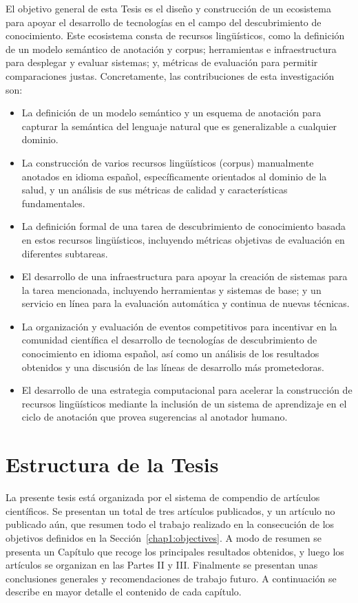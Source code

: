 El objetivo general de esta Tesis es el diseño y construcción de un ecosistema para apoyar el desarrollo de tecnologías
en el campo del descubrimiento de conocimiento. Este ecosistema consta de recursos lingüísticos, como la definición de un modelo semántico de anotación y corpus; herramientas e infraestructura para desplegar y evaluar sistemas; y, métricas de evaluación para permitir comparaciones justas. Concretamente, las contribuciones de esta investigación son:
\begin{itemize}
    \item La definición de un modelo semántico y un esquema de anotación para capturar la semántica del lenguaje natural que es generalizable a cualquier dominio.
    \item La construcción de varios recursos lingüísticos (corpus) manualmente anotados en idioma español, específicamente orientados al dominio de la salud, y un análisis de sus métricas de calidad y características fundamentales.
    \item La definición formal de una tarea de descubrimiento de conocimiento basada en estos recursos lingüísticos, incluyendo métricas objetivas de evaluación en diferentes subtareas.
    \item El desarrollo de una infraestructura para apoyar la creación de sistemas para la tarea mencionada, incluyendo herramientas y sistemas de base; y un servicio en línea para la evaluación automática y continua de nuevas técnicas.
    \item La organización y evaluación de eventos competitivos para incentivar en la comunidad científica el desarrollo de tecnologías de descubrimiento de conocimiento en idioma español, así como un análisis de los resultados obtenidos y una discusión de las líneas de desarrollo más prometedoras.
    \item El desarrollo de una estrategia computacional para acelerar la construcción de recursos lingüísticos mediante la inclusión de un sistema de aprendizaje en el ciclo de anotación que provea sugerencias al anotador humano.
\end{itemize}

\section{Estructura de la Tesis}
\label{chap1:thesis-structure}

La presente tesis está organizada por el sistema de compendio de artículos científicos. Se presentan un total de tres artículos publicados, y un artículo no publicado aún, que resumen todo el trabajo realizado en la consecución de los objetivos definidos en la Sección~\ref{chap1:objectives}. A modo de resumen se presenta un Capítulo que recoge los principales resultados obtenidos, y luego los artículos se organizan en las Partes II y III. Finalmente se presentan unas conclusiones generales y recomendaciones de trabajo futuro. A continuación se describe en mayor detalle el contenido de cada capítulo.

